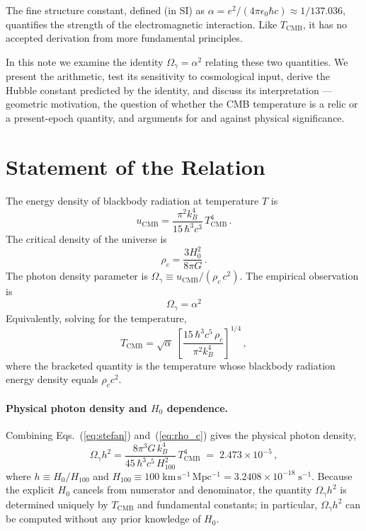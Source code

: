\documentclass[12pt, a4paper]{article}
\begin{document}
The fine structure constant, defined (in SI) as $\alpha = e^2/(4\pi\epsilon_0\hbar c) \approx 1/137.036$, quantifies the strength of the electromagnetic interaction. Like $T_{\mathrm{CMB}}$, it has no accepted derivation from more fundamental principles.

In this note we examine the identity $\Omega_\gamma = \alpha^2$ relating these two quantities. We present the arithmetic, test its sensitivity to cosmological input, derive the Hubble constant predicted by the identity, and discuss its interpretation --- geometric motivation, the question of whether the CMB temperature is a relic or a present-epoch quantity, and arguments for and against physical significance.

\newpage
\section{Statement of the Relation}
\label{sec:relation}

The energy density of blackbody radiation at temperature $T$ is
\begin{equation}
    u_{\mathrm{CMB}} = \frac{\pi^2 k_B^4}{15\,\hbar^3 c^3}\,T_{\mathrm{CMB}}^4\,.
\label{eq:stefan}
\end{equation}
The critical density of the universe is
\begin{equation}
    \rho_c = \frac{3 H_0^2}{8\pi G}\,.
\label{eq:rho_c}
\end{equation}
The photon density parameter is $\Omega_\gamma \equiv u_{\mathrm{CMB}}/(\rho_c\,c^2)$. The empirical observation is
\begin{equation}
    \boxed{\;\Omega_\gamma = \alpha^2\;}
\label{eq:main_relation}
\end{equation}
Equivalently, solving for the temperature,
\begin{equation}
    T_{\mathrm{CMB}} = \sqrt{\alpha}\;\left[\frac{15\,\hbar^3 c^5\,\rho_c}{\pi^2 k_B^4}\right]^{1/4}\,,
\label{eq:T_from_alpha}
\end{equation}
where the bracketed quantity is the temperature whose blackbody radiation energy density equals $\rho_c c^2$.

\paragraph{Physical photon density and $H_0$ dependence.}
Combining Eqs.~(\ref{eq:stefan}) and~(\ref{eq:rho_c}) gives the physical photon density,
\begin{equation}
    \Omega_\gamma h^2 = \frac{8\pi^3 G\,k_B^4}{45\,\hbar^3 c^5\,H_{100}^2}\,T_{\mathrm{CMB}}^4 \;=\; 2.473\times 10^{-5}\,,
\label{eq:Omega_gamma_h2}
\end{equation}
where $h \equiv H_0/H_{100}$ and $H_{100} \equiv 100\;\mathrm{km\,s^{-1}\,Mpc^{-1}} = 3.2408\times 10^{-18}\;\mathrm{s^{-1}}$. Because the explicit $H_0$ cancels from numerator and denominator, the quantity $\Omega_\gamma h^2$ is determined uniquely by $T_{\mathrm{CMB}}$ and fundamental constants; in particular, $\Omega_\gamma h^2$ can be computed without any prior knowledge of $H_0$.
\end{document}
